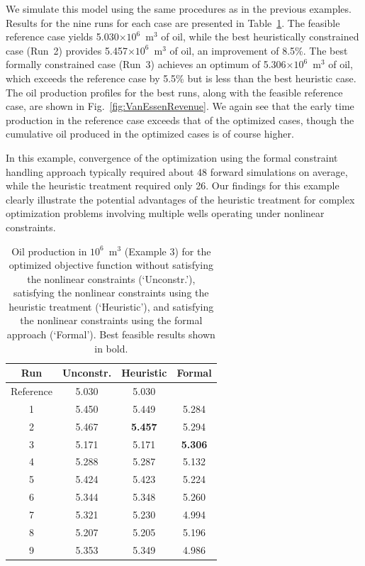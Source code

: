 \documentclass[twocolumn,numbook]{svjour3}          %
\begin{document}
We simulate this model using the same procedures as in the previous examples.
Results for the nine runs for each case are presented in
Table~\ref{table:vanessen}. The feasible reference case yields 5.030$\times 10^6$~m$^3$ of
oil, while the best heuristically constrained case (Run~2) provides 5.457$\times 10^6$~m$^3$
of oil, an improvement of 8.5\%. The best formally constrained case (Run~3)
achieves an optimum of 5.306$\times 10^6$~m$^3$ of oil, which exceeds the reference case by
5.5\% but is less than the best heuristic case. The oil production profiles
for the best runs, along with the feasible reference case, are shown in
Fig.~\ref{fig:VanEssenRevenue}. We again see that the early time production in
the reference case exceeds that of the optimized cases, though the cumulative
oil produced in the optimized cases is of course higher. 

In this example, convergence of the optimization using the formal constraint handling approach 
typically required about 48 forward simulations on average, while the heuristic treatment required only 26.
Our findings for this example clearly illustrate the potential
advantages of the heuristic treatment for complex optimization problems involving multiple wells
operating under nonlinear constraints.




\begin{table}
\centering
\caption{Oil production in $10^6$~m$^3$ (Example 3) for the optimized objective function
         without satisfying the nonlinear constraints (`Unconstr.'), satisfying the nonlinear constraints
         using the heuristic treatment (`Heuristic'), and satisfying the nonlinear constraints
         using the formal approach (`Formal'). Best feasible results shown in bold.}
\begin{tabular}{|c|c|c|c|}
\hline
 Run              & Unconstr. & Heuristic & Formal     \\
\hline
Reference         & 5.030 &  5.030    &          \\
1 & 5.450 &  5.449   &  5.284   \\
2 & 5.467 &\bf{5.457} &  5.294   \\
3 & 5.171 &  5.171   &\bf{5.306}\\
4 & 5.288 &  5.287   &  5.132   \\
5 & 5.424 &  5.423   &  5.224   \\
6 & 5.344 &  5.348   &  5.260   \\
7 & 5.321 &  5.230   &  4.994   \\
8 & 5.207 &  5.205   &  5.196   \\
9 & 5.353 &  5.349   &  4.986   \\
\hline
\end{tabular}
  \label{table:vanessen}
\end{table}
\end{document}
